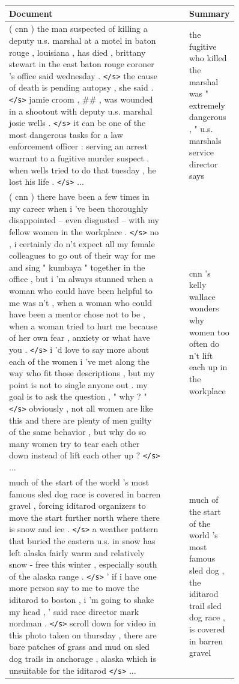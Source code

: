 \documentclass[12pt]{report}
\begin{document}
\begin{figure}
\centering
\begin{tabular}{p{0.7\linewidth} r p{0.2\linewidth}}
\toprule 
\textbf{Document} & & \textbf{Summary} \\
\midrule 
( cnn ) the man suspected of killing a deputy u.s. marshal at a motel in baton rouge , louisiana , has died , brittany stewart in the east baton rouge coroner 's office said wednesday . \texttt{</s>} the cause of death is pending autopsy , she said . \texttt{</s>} jamie croom , \#\# , was wounded in a shootout with deputy u.s. marshal josie wells . \texttt{</s>} it can be one of the most dangerous tasks for a law enforcement officer : serving an arrest warrant to a fugitive murder suspect . when wells tried to do that tuesday , he lost his life . \texttt{</s>}  ... & & the fugitive who killed the marshal was " extremely dangerous , " u.s. marshals service director says \\
\midrule
( cnn ) there have been a few times in my career when i 've been thoroughly disappointed -- even disgusted -- with my fellow women in the workplace . \texttt{</s>} no , i certainly do n't expect all my female colleagues to go out of their way for me and sing " kumbaya " together in the office , but i 'm always stunned when a woman who could have been helpful to me was n't , when a woman who could have been a mentor chose not to be , when a woman tried to hurt me because of her own fear , anxiety or what have you . \texttt{</s>} i 'd love to say more about each of the women i 've met along the way who fit those descriptions , but my point is not to single anyone out . my goal is to ask the question , " why ? " \texttt{</s>} obviously , not all women are like this and there are plenty of men guilty of the same behavior , but why do so many women try to tear each other down instead of lift each other up ? \texttt{</s>} ... & & cnn 's kelly wallace wonders why women too often do n't lift each up in the workplace \\
\midrule
much of the start of the world 's most famous sled dog race is covered in barren gravel , forcing iditarod organizers to move the start further north where there is snow and ice . \texttt{</s>} a weather pattern that buried the eastern u.s. in snow has left alaska fairly warm and relatively snow - free this winter , especially south of the alaska range . \texttt{</s>} ' if i have one more person say to me to move the iditarod to boston , i 'm going to shake my head , ' said race director mark nordman . \texttt{</s>} scroll down for video in this photo taken on thursday , there are bare patches of grass and mud on sled dog trails in anchorage , alaska which is unsuitable for the iditarod \texttt{</s>}  ... & & much of the start of the world 's most famous sled dog , the iditarod trail sled dog race , is covered in barren gravel \\

\end{tabular}
\end{figure}
\end{document}
